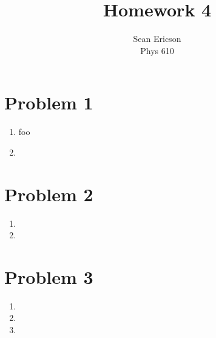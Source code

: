 \documentclass[12pt]{article}
\begin{document}
\title{Homework 4}
\author{Sean Ericson \\ Phys 610}
\maketitle

\section*{Problem 1}
\begin{enumerate}[label=(\alph*)]
    \item foo
    \item
\end{enumerate}

\section*{Problem 2}
\begin{enumerate}[label=(\alph*)]
    \item 
    \item
\end{enumerate}

\section*{Problem 3}
\begin{enumerate}[label=(\alph*)]
    \item 
    \item
    \item
\end{enumerate}


\end{document}
